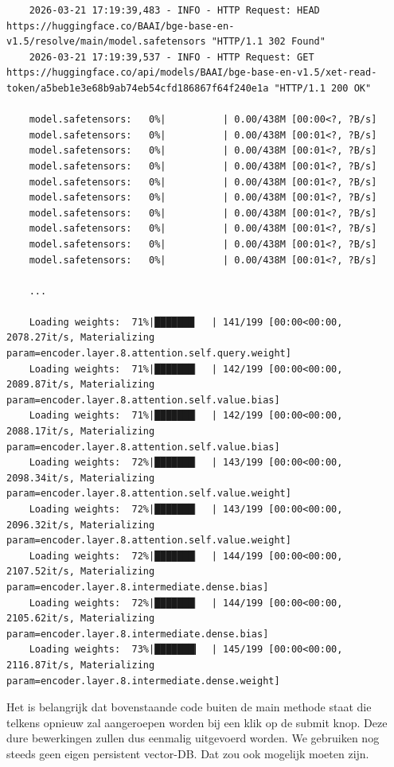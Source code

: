 
\begin{verbatim}
    2026-03-21 17:19:39,483 - INFO - HTTP Request: HEAD https://huggingface.co/BAAI/bge-base-en-v1.5/resolve/main/model.safetensors "HTTP/1.1 302 Found"
    2026-03-21 17:19:39,537 - INFO - HTTP Request: GET https://huggingface.co/api/models/BAAI/bge-base-en-v1.5/xet-read-token/a5beb1e3e68b9ab74eb54cfd186867f64f240e1a "HTTP/1.1 200 OK"
    
    model.safetensors:   0%|          | 0.00/438M [00:00<?, ?B/s]
    model.safetensors:   0%|          | 0.00/438M [00:01<?, ?B/s]
    model.safetensors:   0%|          | 0.00/438M [00:01<?, ?B/s]
    model.safetensors:   0%|          | 0.00/438M [00:01<?, ?B/s]
    model.safetensors:   0%|          | 0.00/438M [00:01<?, ?B/s]
    model.safetensors:   0%|          | 0.00/438M [00:01<?, ?B/s]
    model.safetensors:   0%|          | 0.00/438M [00:01<?, ?B/s]
    model.safetensors:   0%|          | 0.00/438M [00:01<?, ?B/s]
    model.safetensors:   0%|          | 0.00/438M [00:01<?, ?B/s]
    model.safetensors:   0%|          | 0.00/438M [00:01<?, ?B/s]
    
    ...
    
    Loading weights:  71%|███████   | 141/199 [00:00<00:00, 2078.27it/s, Materializing param=encoder.layer.8.attention.self.query.weight]
    Loading weights:  71%|███████▏  | 142/199 [00:00<00:00, 2089.87it/s, Materializing param=encoder.layer.8.attention.self.value.bias]  
    Loading weights:  71%|███████▏  | 142/199 [00:00<00:00, 2088.17it/s, Materializing param=encoder.layer.8.attention.self.value.bias]
    Loading weights:  72%|███████▏  | 143/199 [00:00<00:00, 2098.34it/s, Materializing param=encoder.layer.8.attention.self.value.weight]
    Loading weights:  72%|███████▏  | 143/199 [00:00<00:00, 2096.32it/s, Materializing param=encoder.layer.8.attention.self.value.weight]
    Loading weights:  72%|███████▏  | 144/199 [00:00<00:00, 2107.52it/s, Materializing param=encoder.layer.8.intermediate.dense.bias]    
    Loading weights:  72%|███████▏  | 144/199 [00:00<00:00, 2105.62it/s, Materializing param=encoder.layer.8.intermediate.dense.bias]
    Loading weights:  73%|███████▎  | 145/199 [00:00<00:00, 2116.87it/s, Materializing param=encoder.layer.8.intermediate.dense.weight]
\end{verbatim}

Het is belangrijk dat bovenstaande code buiten de main methode staat die telkens opnieuw zal aangeroepen worden bij een klik op de submit knop. Deze dure bewerkingen zullen dus eenmalig uitgevoerd worden. We gebruiken nog steeds geen eigen persistent vector-DB. Dat zou ook mogelijk moeten zijn.


